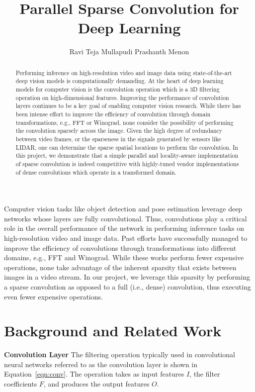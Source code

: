 \documentclass{article}
\title{Parallel Sparse Convolution for Deep Learning}
\author{
  Ravi Teja Mullapudi 
  \And
  Prashanth Menon
}
\begin{document}

\maketitle

\begin{abstract}
Performing inference on high-resolution video and image data using
state-of-the-art deep vision models is computationally demanding.  At the
heart of deep learning models for computer vision is the convolution
operation which is a 3D filtering operation on high-dimensional features.
Improving the performance of convolution layers continues to be a key goal
of enabling computer vision research.  While there has been intense effort
to improve the efficiency of convolution through domain transformations,
e.g., FFT or Winograd, none consider the possibility of performing the
convolution sparsely across the image.  Given the high degree of redundancy
between video frames, or the sparseness in the signals generated by sensors
like LIDAR, one can determine the sparse spatial locations to perform the 
convolution.  In this project, we demonstrate that a simple parallel and 
locality-aware implementation of sparse convolution is indeed competitive 
with highly-tuned vendor implementations of dense convolutions which operate 
in a transformed domain.
\end{abstract}

\newcommand{\floor}[1]{\lfloor #1 \rfloor}
\newcommand{\ceil}[1]{\lceil #1 \rceil}

Computer vision tasks like object detection and pose estimation leverage
deep networks whose layers are fully convolutional. Thus, convolutions
play a critical role in the overall performance of the network in performing
inference tasks on high-resolution video and image data. Past efforts have
successfully managed to improve the efficiency of convolutions through
transformations into different domains, e.g., FFT and Winograd. While these
works perform fewer expensive operations, none take advantage of the inherent 
sparsity that exists between images in a video stream. In our project, we
leverage this sparsity by performing a sparse convolution as opposed to a
full (i.e., dense) convolution, thus executing even fewer expensive operations.

\section{Background and Related Work}
\label{sec:bg-rw}
\textbf{Convolution Layer} 
The filtering operation typically used in convolutional neural networks referred
to as the convolution layer is shown in Equation~\ref{eqn:conv}. The operation
takes as input features $I$, the filter coefficients $F$, and produces the
output features $O$.
\end{document}
